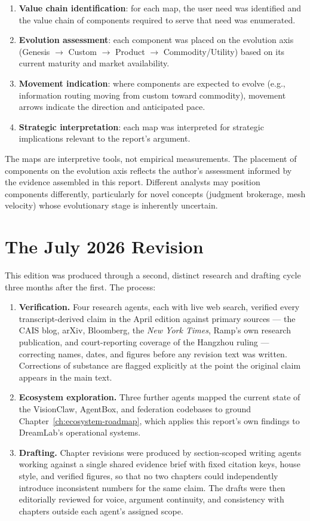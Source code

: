 \begin{enumerate}
  \item \textbf{Value chain identification}: for each map, the user need was identified and the value chain of components required to serve that need was enumerated.
  \item \textbf{Evolution assessment}: each component was placed on the evolution axis (Genesis $\rightarrow$ Custom $\rightarrow$ Product $\rightarrow$ Commodity/Utility) based on its current maturity and market availability.
  \item \textbf{Movement indication}: where components are expected to evolve (e.g., information routing moving from custom toward commodity), movement arrows indicate the direction and anticipated pace.
  \item \textbf{Strategic interpretation}: each map was interpreted for strategic implications relevant to the report's argument.
\end{enumerate}

The maps are interpretive tools, not empirical measurements. The placement of components on the evolution axis reflects the author's assessment informed by the evidence assembled in this report. Different analysts may position components differently, particularly for novel concepts (judgment brokerage, mesh velocity) whose evolutionary stage is inherently uncertain.

\section{The July 2026 Revision}

This edition was produced through a second, distinct research and drafting cycle three months after the first. The process:

\begin{enumerate}
  \item \textbf{Verification.} Four research agents, each with live web search, verified every transcript-derived claim in the April edition against primary sources --- the CAIS blog, arXiv, Bloomberg, the \emph{New York Times}, Ramp's own research publication, and court-reporting coverage of the Hangzhou ruling --- correcting names, dates, and figures before any revision text was written. Corrections of substance are flagged explicitly at the point the original claim appears in the main text.
  \item \textbf{Ecosystem exploration.} Three further agents mapped the current state of the VisionClaw, AgentBox, and federation codebases to ground Chapter~\ref{ch:ecosystem-roadmap}, which applies this report's own findings to DreamLab's operational systems.
  \item \textbf{Drafting.} Chapter revisions were produced by section-scoped writing agents working against a single shared evidence brief with fixed citation keys, house style, and verified figures, so that no two chapters could independently introduce inconsistent numbers for the same claim. The drafts were then editorially reviewed for voice, argument continuity, and consistency with chapters outside each agent's assigned scope.
\end{enumerate}

